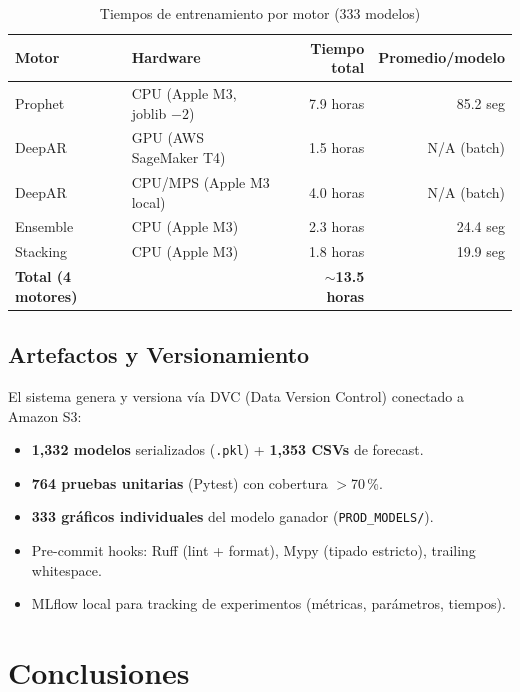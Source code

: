 \documentclass[12pt, letterpaper]{article}
\begin{document}
\begin{table}[H]
\centering
\caption{Tiempos de entrenamiento por motor (333 modelos)}
\label{tab:tiempos}
\small
\begin{tabular}{llrr}
\toprule
\textbf{Motor} & \textbf{Hardware} & \textbf{Tiempo total} & \textbf{Promedio/modelo} \\
\midrule
Prophet   & CPU (Apple M3, joblib $-2$) & 7.9 horas  & 85.2 seg \\
DeepAR    & GPU (AWS SageMaker T4)     & 1.5 horas  & N/A (batch) \\
DeepAR    & CPU/MPS (Apple M3 local)   & 4.0 horas  & N/A (batch) \\
Ensemble  & CPU (Apple M3)             & 2.3 horas  & 24.4 seg \\
Stacking  & CPU (Apple M3)             & 1.8 horas  & 19.9 seg \\
\midrule
\textbf{Total (4 motores)} & & \textbf{$\sim$13.5 horas} & \\
\bottomrule
\end{tabular}
\end{table}

\subsection{Artefactos y Versionamiento}

El sistema genera y versiona vía DVC (Data Version Control) conectado a Amazon S3:
\begin{itemize}[noitemsep]
    \item \textbf{1,332 modelos} serializados (\texttt{.pkl}) + \textbf{1,353 CSVs} de forecast.
    \item \textbf{764 pruebas unitarias} (Pytest) con cobertura $>$70\,\%.
    \item \textbf{333 gráficos individuales} del modelo ganador (\texttt{PROD\_MODELS/}).
    \item Pre-commit hooks: Ruff (lint + format), Mypy (tipado estricto), trailing whitespace.
    \item MLflow local para tracking de experimentos (métricas, parámetros, tiempos).
\end{itemize}

\newpage

\section{Conclusiones}\label{sec:conclusiones}
\end{document}
